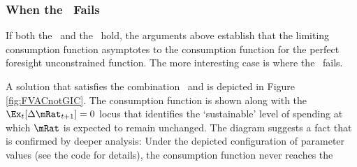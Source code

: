 \documentclass[BufferStockTheory]{subfiles}
\begin{document}
\hypertarget{The-GIC}{}
\hypertarget{When-the-GIC-Fails}{}
\subsubsection{When the \GIC~Fails}

If both the \GIC~and the \RIC~hold, the arguments above establish that the limiting consumption
function asymptotes to the consumption function for the perfect foresight unconstrained function.
The more interesting case is where the \GIC~fails.
\begin{comment}
  \WW{}{The same
    steps as above lead to the same implication that this requires
    $\InvEpShkInv < (\Rfree/\PGro)^{1/\CRRA}\uInvEpShkuInv^{1-1/\CRRA}$,
    but when the \RIC~$\Rfree/\PGro > 1$ holds this condition is much more
    easily satisfied.}
  If the \FVAC~holds but the \GIC~does not, the parameters must satisfy:
  \begin{align}
    \DiscFac \PGro^{1-\CRRA}\Ex[\pshk^{1-\CRRA}] & < 1 < (\Rfree\DiscFac)^{1/\CRRA}(\PGro\Ex[\pshk^{-1}])^{-1}. \label{eq:FVACnotGIC}
  \end{align}

  Note first that by Jensens's inequality $\Ex[\pshk^{1-\CRRA}] > 1$ and $(\Ex[\pshk^{-1}])^{-1} < 1$,
  so \eqref{eq:FVACnotGIC} is stronger than
  \begin{align}
    \DiscFac \PGro^{1-\CRRA} & < 1 < (\Rfree\DiscFac)^{1/\CRRA}/\PGro. \label{eq:PFFVACnotPFGIC}
  \end{align}


  Suppose $\PGro=1$, $\CRRA=2$ and $\pshk$ is lognormally distributed with $\sigma^{2}_{\pshk}=0.01$ (that is, $\log \pshk \sim \mathcal{N}(-\sigma_{\psi}^{2}/2,\sigma_{\psi}^{2})$) so that $\Ex_{t}[\pshk_{t+1}^{1-\CRRA}] =\Ex_{t}[\pshk_{t+1}^{-1}] =\exp(\sigma^{2}_{\psi})=e^{0.01}.$  Then the condition becomes
  \begin{align}
    \DiscFac e^{0.01} & < 1 < (\Rfree \DiscFac)^{1/2}e^{-0.01}
  \end{align}
  which can be satisfied, for example, by $\DiscFac = 0.96$ and $\Rfree=1.08$.
\end{comment}
A solution that satisfies the combination \FVAC~and
\cncl{\GIC} is depicted in Figure \ref{fig:FVACnotGIC}.  The
consumption function is shown along with the $\Ex_{t}[\Delta
\mRat_{t+1}]=0$ locus that identifies the `sustainable' level of
spending at which $\mRat$ is expected to remain unchanged.  The
diagram suggests a fact that is confirmed by deeper analysis: Under
the depicted configuration of parameter values (see the code for details), the consumption function never reaches the
\end{document}
